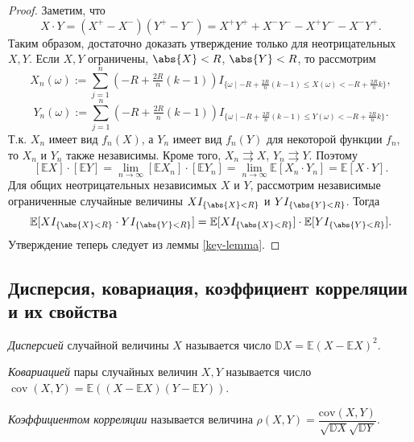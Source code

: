 \begin{proof}
    Заметим, что
    \[
        X \cdot Y = (X^+ - X^-)(Y^+ - Y^-) = X^+ Y^+ + X^-Y^- - X^+ Y^- - X^-Y^+.
    \]
    Таким образом, достаточно доказать утверждение только для неотрицательных $X, Y$.
    Если $X, Y$ ограничены, $\abs{X} < R$, $\abs{Y} < R$, то рассмотрим
    \[
        X_n(\omega) := \sum_{j = 1}^{n}(-R + \tfrac{2R}{n}(k - 1)) I_{\{ \omega \mid -R + \frac{2R}{n}(k - 1) \leqslant X(\omega) < -R + \frac{2R}{n} k\}},
    \]
    \[
        Y_n(\omega) := \sum_{j = 1}^{n}(-R + \tfrac{2R}{n}(k - 1)) I_{\{\omega \mid -R + \frac{2R}{n}(k - 1) \leqslant Y(\omega) < -R + \frac{2R}{n} k\}}.
    \]
    Т.к. $X_n$ имеет вид $f_n(X)$, а $Y_n$ имеет вид $f_n(Y)$ для некоторой функции $f_n$, то $X_n$ и $Y_n$ также независимы.
    Кроме того, $X_n \rightrightarrows X$, $Y_n \rightrightarrows Y$.
    Поэтому
    \[
        [\mathbb{E} X] \cdot [\mathbb{E} Y] = \lim\limits_{n \to \infty}[\mathbb{E} X_n] \cdot [\mathbb{E} Y_n]
     = \lim\limits_{n \to \infty}\mathbb{E}[X_n \cdot Y_n] = \mathbb{E}[X \cdot Y].
    \]
    Для общих неотрицательных независимых $X$ и $Y$, рассмотрим независимые ограниченные случайные величины $X I_{\{\abs{X} < R\}}$ и $Y I_{\{\abs{Y} < R\}}$.
    Тогда
    \[
        \mathbb{E}[X I_{\{\abs{X} < R\}} \cdot Y I_{\{\abs{Y} < R\}}] = \mathbb{E}[X I_{\{\abs{X} < R\}}] \cdot \mathbb{E}[Y I_{\{\abs{Y} < R\}}].
    \]
    Утверждение теперь следует из леммы \ref{key-lemma}.
\end{proof}

\sectionbreak
\subsection{Дисперсия, ковариация, коэффициент корреляции и их свойства}

\begin{definition*}
    {\it Дисперсией} случайной величины $X$ называется число $\mathbb{D}X = \mathbb{E}(X - \mathbb{E}X)^2$.
\end{definition*}

\begin{definition*}
    {\it Ковариацией} пары случайных величин $X, Y$ называется число $\operatorname{cov}(X, Y) = \mathbb{E} \left( (X - \mathbb{E}X)(Y - \mathbb{E}Y) \right)$.
\end{definition*}

\begin{definition*}
    {\it Коэффициентом корреляции} называется величина $\rho(X, Y) = \dfrac{\mathrm{cov}(X, Y)}{\sqrt{\mathbb{D}X} \sqrt{\mathbb{D}Y}}$.
\end{definition*}


